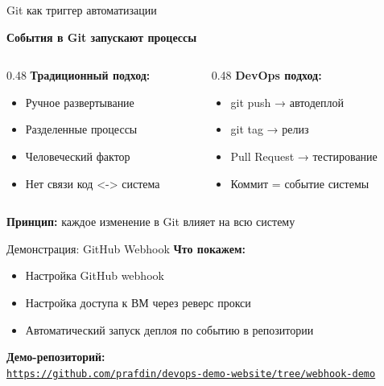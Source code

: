\documentclass[aspectratio=169]{beamer}
\begin{document}
    \begin{frame}{Git как триггер автоматизации}
        \begin{center}
            \large
            \textbf{События в Git запускают процессы}
        \end{center}
        
        \vspace{0.5cm}
        
        \begin{columns}
            \begin{column}{0.48\textwidth}
                \textbf{Традиционный подход:}
                \begin{itemize}
                    \item Ручное развертывание
                    \item Разделенные процессы
                    \item Человеческий фактор
                    \item Нет связи код <-> система
                \end{itemize}
            \end{column}
            
            \begin{column}{0.48\textwidth}
                \textbf{DevOps подход:}
                \begin{itemize}
                    \item git push → автодеплой
                    \item git tag → релиз
                    \item Pull Request → тестирование
                    \item Коммит = событие системы
                \end{itemize}
            \end{column}
        \end{columns}
        
        \vspace{0.5cm}
        
        \textbf{Принцип:} каждое изменение в Git влияет на всю систему
    \end{frame}

    \begin{frame}{Демонстрация: GitHub Webhook}
        \textbf{Что покажем:}
        \begin{itemize}
            \item Настройка GitHub webhook
            \item Настройка доступа к ВМ через реверс прокси
            \item Автоматический запуск деплоя по событию в репозитории
        \end{itemize}
        
        \vspace{0.2cm}
        \textbf{Демо-репозиторий:} \\
        \href{https://github.com/prafdin/devops-demo-website/tree/webhook-demo}{\texttt{https://github.com/prafdin/devops-demo-website/tree/webhook-demo}}
    \end{frame}
\end{document}
